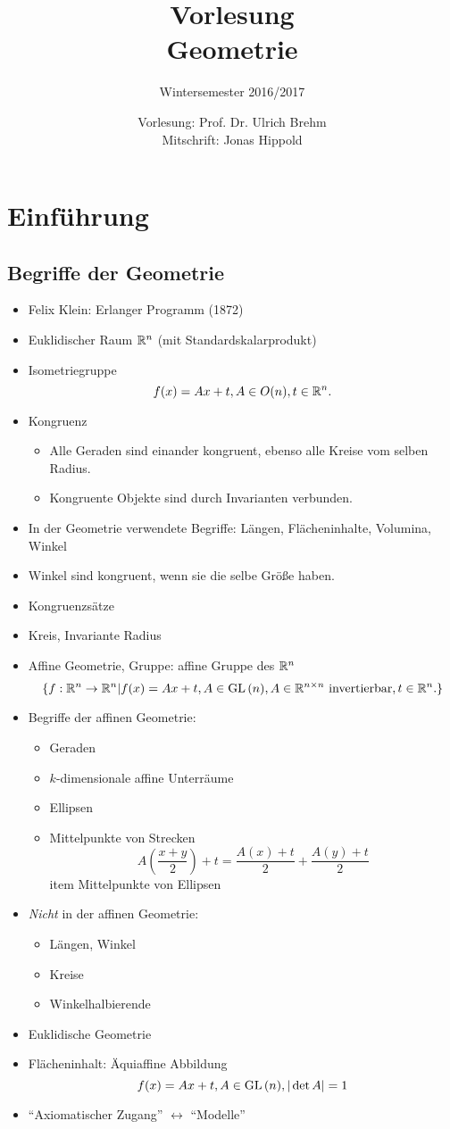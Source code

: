 \documentclass[
 a4paper,
 12pt,
 parskip=half
 ]{scrartcl}
\title{Vorlesung\\Geometrie}
\subtitle{Wintersemester 2016/2017}
\author{Vorlesung: Prof. Dr. Ulrich Brehm\\Mitschrift: Jonas Hippold}
\theoremstyle{plain}
\theoremstyle{definition}
\numberwithin{equation}{section}
\begin{document}
\maketitle

\tableofcontents

\setcounter{secnumdepth}{0}
\section{Einführung}
\subsection{Begriffe der Geometrie}
\begin{itemize}
 \item Felix Klein: Erlanger Programm (1872)
 \item Euklidischer Raum $\mathbb{R}^n$ (mit Standardskalarprodukt)
 \item Isometriegruppe
  \[ f(x) = Ax + t, A \in O(n), t \in \mathbb{R}^n. \]
 \item Kongruenz
  \begin{itemize} 
   \item Alle Geraden sind einander kongruent, ebenso alle Kreise vom selben Radius.
   \item Kongruente Objekte sind durch Invarianten verbunden.
  \end{itemize}
 \item In der Geometrie verwendete Begriffe: Längen, Flächeninhalte, Volumina, Winkel
 \item Winkel sind kongruent, wenn sie die selbe Größe haben.
 \item Kongruenzsätze
 \item Kreis, Invariante Radius
 \item Affine Geometrie, Gruppe: affine Gruppe des $\mathbb{R}^n$
  \[ \{ f: \mathbb{R}^n \to \mathbb{R}^n | f(x) = Ax + t, A \in \mathrm{GL}\,(n), A \in \mathbb{R}^{n \times n} \text{ invertierbar}, t \in \mathbb{R}^n. \} \]
 \item Begriffe der affinen Geometrie:
  \begin{itemize}
   \item Geraden
   \item $k$-dimensionale affine Unterräume
   \item Ellipsen
   \item Mittelpunkte von Strecken 
    \[ A \left( \frac{x+y}{2} \right) + t = \frac{A(x) + t}{2} + \frac{A(y) + t}{2} \]
   item Mittelpunkte von Ellipsen
  \end{itemize}
 \item \emph{Nicht} in der affinen Geometrie: 
  \begin{itemize}
   \item Längen, Winkel
   \item Kreise
   \item Winkelhalbierende
  \end{itemize}
 \item Euklidische Geometrie
 \item Flächeninhalt: Äquiaffine Abbildung
  \[ f(x) = Ax + t, A \in \mathrm{GL}\,(n), |\det A| = 1 \]
 \item ``Axiomatischer Zugang'' $\longleftrightarrow$ ``Modelle''
\end{itemize}
\end{document}
